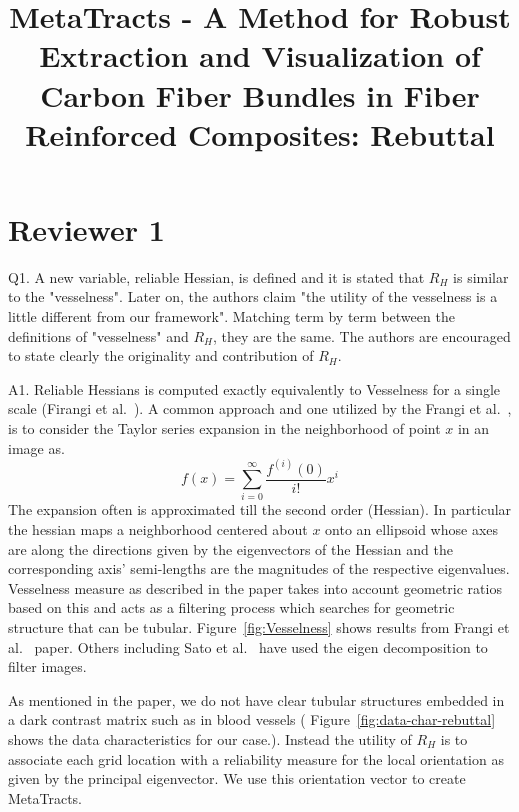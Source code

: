 \documentclass[]{article}
\title{MetaTracts - A Method for Robust Extraction and Visualization of Carbon Fiber Bundles in Fiber Reinforced Composites: Rebuttal}
\author{}
\begin{document}
\maketitle


\section{Reviewer 1}
\color{red}
Q1. A new variable, reliable Hessian, is defined and it is stated that $R_{H}$ is similar to the "vesselness".  Later on, the authors claim "the utility of the vesselness is a little different from our framework". Matching term by term between the definitions of "vesselness" and $R_{H}$, they are the same. The authors are encouraged to state clearly the originality and contribution of $R_{H}$.
\color{black}

A1. Reliable Hessians is computed exactly equivalently to Vesselness for a single scale (Firangi et al.~\cite{Frangi1998}). A common approach and one utilized by the Frangi et al.~\cite{Frangi1998}, is to consider the Taylor series expansion in the neighborhood of point $x$ in an image as.
\begin{equation}
f(x) = \sum_{i=0}^{\infty}\frac{f^{(i)}(0)}{i!}x^{i}
\end{equation}
The expansion often is approximated till the second order (Hessian). In particular the hessian maps a  neighborhood  centered about $x$ onto an ellipsoid  whose axes are along the directions given by the eigenvectors of the Hessian and the corresponding axis' semi-lengths are the magnitudes of the respective eigenvalues. Vesselness measure as described in the paper takes into account geometric ratios based on this and acts as a filtering process which searches for geometric structure that can be tubular. Figure~\ref{fig:Vesselness} shows results from Frangi et al.~\cite{Frangi1998} paper. Others including Sato et al.~\cite{Sato1997} have used the eigen decomposition to filter images.

As mentioned in the paper, we do not have clear tubular structures embedded in a dark contrast matrix such as in blood vessels ( Figure~\ref{fig:data-char-rebuttal} shows the data characteristics for our case.). Instead  the utility of $R_{H}$ is  to associate each grid location with a reliability measure for the local orientation as given by the  principal eigenvector. We use this orientation vector to create MetaTracts.
\end{document}
